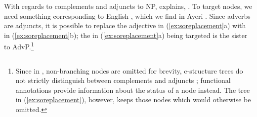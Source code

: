 

With regards to complements and adjuncts to NP, \citet{carnie2013} explains,
. To
target  nodes, we need something corresponding to English ,
which we find in Ayeri . Since adverbs are
adjuncts, it is possible to replace the adjective  in
(\ref{ex:soreplacement}a) with  in (\ref{ex:soreplacement}b); the
 in (\ref{ex:soreplacement}a) being targeted is the sister to
AdvP.\footnote{Since in \Lfg{}, non-branching  nodes are omitted for
brevity, c-structure trees do not strictly distinguish between complements and
adjuncts \citep[127, fn. 52]{bresnan2016}; functional annotations provide
information about the status of a node instead. The tree in
(\ref{ex:soreplacement}), however, keeps those  nodes which would
otherwise be omitted.}

